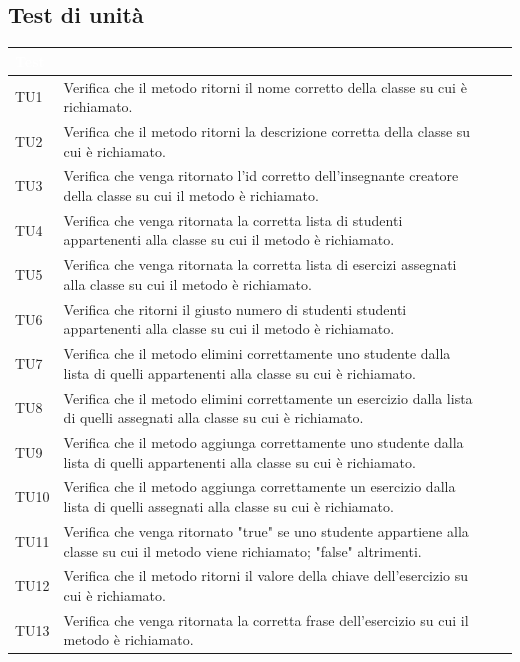 \subsection{Test di unità}
\begin{longtable}{|>{\centering\arraybackslash}m{1.6cm}|>{\centering\arraybackslash}m{6.41cm}|>{\centering\arraybackslash}m{3.1cm}| c |}		
		\rowcolor{LightBlue}
		\textbf{\textcolor{white}{Test}}
		& \multicolumn{1}{|c|}{\textbf{\textcolor{white}{ Descrizione}}}\\
		\hline
		TU1 & Verifica che il metodo ritorni il nome corretto della classe su cui è richiamato. \\ \hline
		TU2 & Verifica che il metodo ritorni la descrizione corretta della classe su cui è richiamato.\\ \hline
		TU3 & Verifica che venga ritornato l'id corretto dell'insegnante creatore della classe su cui il metodo è richiamato. \\ \hline
		TU4 & Verifica che venga ritornata la corretta lista di studenti appartenenti alla classe su cui il metodo è richiamato.  \\ \hline
		TU5 & Verifica che venga ritornata la corretta lista di esercizi assegnati alla classe su cui il metodo è richiamato.\\ \hline
		TU6 & Verifica che ritorni il giusto numero di studenti studenti appartenenti alla classe su cui il metodo è richiamato.  \\ \hline
		TU7 & Verifica che il metodo elimini correttamente uno studente dalla lista di quelli appartenenti alla classe su cui è  richiamato.  \\ \hline
		TU8 & Verifica che il metodo elimini correttamente un esercizio dalla lista di quelli assegnati alla classe su cui è  richiamato.\\ \hline
		TU9 & Verifica che il metodo aggiunga correttamente uno studente dalla lista di quelli appartenenti alla classe su cui è  richiamato.\\ \hline
		TU10 & Verifica che il metodo aggiunga correttamente un esercizio dalla lista di quelli assegnati alla classe su cui è  richiamato. \\ \hline
		TU11 & Verifica che venga ritornato "true" se uno studente appartiene alla classe su cui il metodo viene richiamato; "false" altrimenti.  \\ \hline		
		TU12 & Verifica che il metodo ritorni il valore della chiave dell'esercizio su cui è richiamato. \\ \hline
		TU13 & Verifica che venga ritornata la corretta frase dell'esercizio su cui il metodo è richiamato. \\ \hline

\end{longtable}
